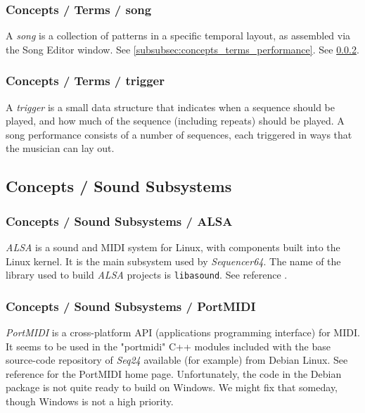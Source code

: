 \subsubsection{Concepts / Terms / song}
\label{subsubsec:concepts_terms_song}

   A \textsl{song} is a collection of patterns in a specific temporal
   layout, as assembled via the Song Editor window.
   See \ref{subsubsec:concepts_terms_performance}.
   See \ref{subsubsec:concepts_terms_trigger}.

\subsubsection{Concepts / Terms / trigger}
\label{subsubsec:concepts_terms_trigger}

   A \textsl{trigger} is a small data structure that indicates when a sequence
   should be played, and how much of the sequence (including repeats) should be
   played.  A song performance consists of a number of sequences, each
   triggered in ways that the musician can lay out.

\subsection{Concepts / Sound Subsystems}
\label{subsec:concepts_sound_subsystems}

\subsubsection{Concepts / Sound Subsystems / ALSA}
\label{subsubsec:concepts_sound_alsa}

   \textsl{ALSA} is a sound and MIDI system for Linux, with components built
   into the Linux kernel. It is the main subsystem used by
   \textsl{Sequencer64}.  The name of the library used to build
   \textsl{ALSA} projects is \texttt{libasound}.
   See reference \cite{alsa}.

\subsubsection{Concepts / Sound Subsystems / PortMIDI}
\label{subsubsec:concepts_sound_portmidi}

   \textsl{PortMIDI} is a cross-platform API (applications programming
   interface) for MIDI.  It seems to be used in the "portmidi" C++ modules
   included with the base source-code repository of \textsl{Seq24} available
   (for example) from Debian Linux.  See reference \cite{portmidi}
   for the PortMIDI home page.  Unfortunately, the code in the Debian
   package is not quite ready to build on Windows.  We might fix that
   someday, though Windows is not a high priority.

